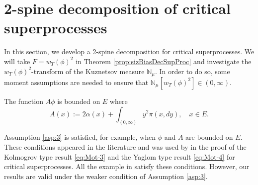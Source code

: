 \section{2-spine decomposition of critical superprocesses}
	In this section, we develop a 2-spine decomposition for critical superprocesses.
	We will take $F = w_T(\phi)^2$ in Theorem \ref{prop:sizBiasDecSupProc}
	and investigate the $w_T(\phi)^2$-transform of the Kuznetsov measure $\mathbb N_\mu$.
	In order to do so, some moment assumptions are needed to ensure that $\mathbb N_\mu[w_T(\phi)^2] \in (0,\infty)$.
\begin{asp}\label{asp:3}
	The function $A\phi$ is bounded on $E$ where
\[
	A(x)
	:= 2\alpha(x) + \int_{(0,\infty)} y^2\pi(x,dy),
	\quad x\in E.
\]
\end{asp}
	Assumption \ref{asp:3} is satisfied, for example, when $\phi$ and $A$ are bounded on $E$.
	These conditions appeared in the literature and was used by \cite{RenSongZhang2015Limit} in the proof of the Kolmogrov type result \eqref{eq:Mot-3} and the Yaglom type result \eqref{eq:Mot-4} for critical superprocesses.
	All the example in \cite{RenSongZhang2015Limit} satisfy these conditions.
	However, our results are valid under the weaker condition of Assumption \ref{asp:3}.

